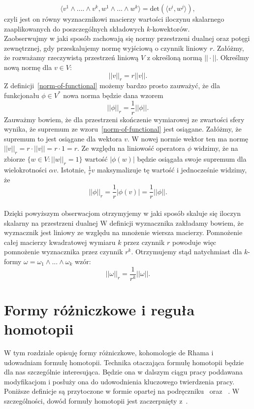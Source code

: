\documentclass[licencjacka]{pracamgr}
\theoremstyle{definition}
\theoremstyle{definition}
\theoremstyle{plain}
\theoremstyle{plain}
\theoremstyle{plain}
\theoremstyle{plain}
\theoremstyle{plain}
\begin{document}
\begin{equation} \langle v^1 \wedge ....\wedge v^k, w^1 \wedge ... \wedge w^k
\rangle = \text{det} \left( \langle v^i, w^j \rangle \right), 
\end{equation}
czyli jest on równy wyznacznikowi macierzy wartości iloczynu skalarnego
zaaplikowanych do poszczególnych składowych $k$-kowektorów.  \\

Zaobserwujmy w jaki sposób zachowają się normy przestrzeni dualnej oraz potęgi
zewnętrznej, gdy przeskalujemy normę wyjściową
o czynnik liniowy $r$.
Załóżmy, że rozważamy rzeczywistą przestrzeń liniową $V$ z określoną
normą $|| \cdot ||$. Określmy nową normę dla $v \in V$:
\[
|| v ||_r = r || v ||.
\]
Z definicji~\ref{norm-of-functional} możemy bardzo prosto zauważyć, że
dla funkcjonału $\phi \in V^\ast$ nowa norma będzie dana 
wzorem
\[
|| \phi ||_r = \frac{1}{r} ||\phi ||.
\]
Zauważmy bowiem, że dla przestrzeni skończenie wymiarowej ze zwartości sfery
wynika, że supremum ze wzoru~\ref{norm-of-functional} jest osiągane.  Załóżmy,
że supremum to jest osiągane dla wektora $v$. W nowej normie wektor ten ma
normę $|| v ||_r = r \cdot || v || = r \cdot 1 = r$. Ze względu na liniowość
operatora $\phi$ widzimy, że na zbiorze $\{w \in V: ||w||_r = 1\}$ wartość $|
\phi (w) |$ będzie osiągała swoje supremum dla wielokrotności $\alpha v$.
Istotnie, $\frac{1}{r} v$ maksymalizuje tę wartość i jednocześnie widzimy, że 
\[
||\phi||_r = \frac{1}{r} |\phi(v)| = \frac{1}{r}|| \phi ||.
\]  \\

Dzięki powyższym obserwacjom otrzymyjemy w jaki sposób skaluje się iloczyn
skalarny na przestrzeni dualnej W definicji wyznacznika zakładamy bowiem, że
wyznacznik jest liniowy ze względu na mnożenie wiersza macierzy. Pomnożenie
całej macierzy kwadratowej wymiaru $k$ przez czynnik $r$ powoduje więc pomnożenie
wyznacznika przez czynnik $r^k$.  Otrzymujemy stąd natychmiast dla $k$-formy
$\omega = \omega_1 \wedge ... \wedge
\omega_k$  wzór:
\begin{equation}\label{scaling-of-norm}
|| \omega ||_r = \frac{1}{r^k} || \omega ||.
\end{equation}


\chapter{Formy różniczkowe i reguła homotopii}\label{chapter-ordinary-cohomology}
W tym rozdziale opisuję formy różniczkowe, kohomologie de Rhama i
udowadniam formułę homotopii.
Technika otaczająca formułę homotopii
będzie dla nas szczególnie interesująca. Będzie ona w dalszym
ciągu pracy poddawana modyfikacjom i posłuży ona 
do udowodnienia kluczowego twierdzenia pracy. 
Poniższe definicje są przytoczone w formie opartej na podręczniku~\cite{lee}
oraz ~\cite{bott}. W szczególności, dowód formuły homotopii jest zaczerpnięty
z~\cite[Rozdział I§4]{bott}. \\
\end{document}
